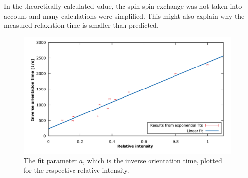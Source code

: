 In the theoretically calculated value, the spin-spin exchange was not taken into account and many calculations were simplified. This might also explain why the measured relaxation time is smaller than predicted.
\begin{figure}
\centering
\includegraphics[width=1.0\linewidth]{graphics/inversetaufit}
\caption[Fit on the inverse orientation times]{The fit parameter $a$, which is the inverse orientation time, plotted for the respective relative intensity.}
\label{fig:inversetaufit}
\end{figure}

